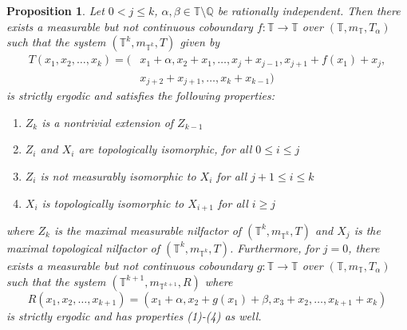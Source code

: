 \documentclass[12pt]{amsart}
\theoremstyle{definition}
\theoremstyle{plain}
\newtheorem{proposition}[theorem]{Proposition}
\theoremstyle{definition}
\numberwithin{equation}{section}
\begin{document}
\begin{proposition} \label{proposition with one coboundary on k}
    Let $0<j \leq  k$, $\alpha,\beta \in \mathbb{T} \setminus \mathbb{Q}$ be rationally independent. Then there exists a measurable but not continuous coboundary $f\colon\mathbb{T} \rightarrow \mathbb{T}$ over $(\mathbb{T},m_{\mathbb{T}},T_{\alpha})$ such that the system $(\mathbb{T}^{k},m_{\mathbb{T}^{k}},T)$ given by 
  \begin{align*}
    T(x_1,x_2,\dots,x_{k})=\Big(&x_1+\alpha,x_2+x_1,\dots,x_{j}+x_{j-1},x_{j+1}+f(x_1)+x_{j},\\
    &x_{j+2}+x_{j+1},\dots,x_{k}+x_{k-1}\Big)
  \end{align*}
 is strictly ergodic and satisfies the following properties:

  \begin{enumerate}
   \item $Z_k$ is a nontrivial extension of $Z_{k-1}$
      \item $Z_{i}$ and $X_{i}$ are topologically isomorphic, for all $0 \leq i \leq j$
      \item $Z_i$ is not measurably isomorphic to $X_i$ for all $j+1 \leq i \leq k$
      \item $X_i$ is topologically isomorphic to $X_{i+1}$ for all $i \geq j$
  \end{enumerate}
where $Z_k$ is the maximal measurable nilfactor of $(\mathbb{T}^{k},m_{\mathbb{T}^{k}},T)$ and $X_j$ is the maximal topological nilfactor of $(\mathbb{T}^{k},m_{\mathbb{T}^{k}},T)$. Furthermore, for $j=0$, there exists a measurable but not continuous coboundary $g\colon \mathbb{T} \rightarrow \mathbb{T}$ over $(\mathbb{T},m_{\mathbb{T}},T_{\alpha})$ such that the system $(\mathbb{T}^{k+1},m_{\mathbb{T}^{k+1}},R)$ where $$R(x_1,x_2,\dots,x_{k+1})=(x_1+\alpha,x_2+g(x_1)+\beta,x_3+x_2,\dots,x_{k+1}+x_k)$$ is strictly ergodic and has properties (1)-(4) as well.
\end{proposition}
\end{document}
